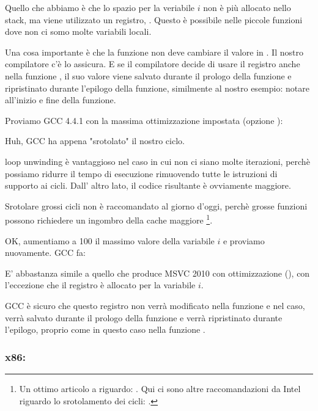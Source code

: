 Quello che abbiamo è che lo spazio per la veriabile $i$ non è più allocato nello stack,
ma viene utilizzato un registro, \ESI.
Questo è possibile nelle piccole funzioni dove non ci somo molte variabili locali.

Una cosa importante è che la funzione \ttf non deve cambiare il valore in \ESI.
Il nostro compilatore c'è lo assicura. 
E se il compilatore decide di usare il registro \ESI anche nella funzione \ttf, il suo valore viene salvato durante il prologo della funzione e ripristinato durante l'epilogo della funzione,
similmente al nostro esempio: notare 
all'inizio e fine della funzione.

Proviamo GCC 4.4.1 con la massima ottimizzazione impostata (opzione \Othree):




Huh, GCC ha appena "srotolato" il nostro ciclo.

\Gls{loop unwinding} è vantaggioso nel caso in cui non ci siano molte iterazioni, perchè possiamo ridurre il tempo di esecuzione rimuovendo tutte le istruzioni di supporto ai cicli. 
Dall' altro lato, il codice risultante è ovviamente maggiore.

Srotolare grossi cicli non è raccomandato al giorno d'oggi, perchè grosse funzioni possono richiedere un ingombro della cache maggiore%
%
\footnote{Un ottimo articolo a riguardo: \DrepperMemory.
Qui ci sono altre raccomandazioni da Intel riguardo lo srotolamento dei cicli: 
.}.

OK, aumentiamo a 100 il massimo valore della variabile $i$ e proviamo nuovamente. GCC fa:



E' abbastanza simile a quello che produce MSVC 2010 con ottimizzazione (\Ox), 
con l'eccezione che il registro \EBX è allocato per la variabile $i$.

GCC è sicuro che questo registro non verrà modificato nella funzione \ttf 
e nel caso, verrà salvato durante il prologo della funzione e verrà ripristinato durante l'epilogo, 
proprio come in questo caso nella funzione \main.

\clearpage
\subsubsection{x86: \olly}
\myindex{\olly}

